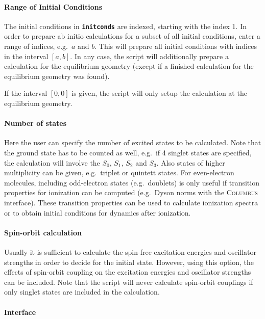 \documentclass[a4paper,11pt,DIV=15,openany,twoside=false]{scrbook}
\newcommand{\ttt}[1]{\textbf{\texttt{#1}}}
\begin{document}
\paragraph{Range of Initial Conditions}

The initial conditions in \ttt{initconds} are indexed, starting with the index 1. In order to prepare ab initio calculations for a subset of all initial conditions, enter a range of indices, e.g.\ $a$ and $b$. This will prepare all initial conditions with indices in the interval $[a,b]$. In any case, the script will additionally prepare a calculation for the equilibrium geometry (except if a finished calculation for the equilibrium geometry was found).

If the interval $[0,0]$ is given, the script will only setup the calculation at the equilibrium geometry.

\paragraph{Number of states}

Here the user can specify the number of excited states to be calculated. Note that the ground state has to be counted as well, e.g.\ if 4 singlet states are specified, the calculation will involve the $S_0$, $S_1$, $S_2$ and $S_3$. Also states of higher multiplicity can be given, e.g.\ triplet or quintett states. 
For even-electron molecules, including odd-electron states (e.g.\ doublets) is only useful if transition properties for ionization can be computed (e.g.\ Dyson norms with the \textsc{Columbus} interface). These transition properties can be used to calculate ionization spectra or to obtain initial conditions for dynamics after ionization.

\paragraph{Spin-orbit calculation}

Usually it is sufficient to calculate the spin-free excitation energies and oscillator strengths in order to decide for the initial state. However, using this option, the effects of spin-orbit coupling on the excitation energies and oscillator strengths can be included. Note that the script will never calculate spin-orbit couplings if only singlet states are included in the calculation.

\paragraph{Interface}
\end{document}
